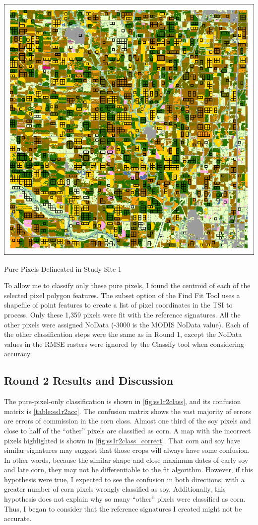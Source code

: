 \begin{ssfigure}
  \centering
  \includegraphics[width=.9\textwidth]{Graphics/Testing/clip1_30mCDL_pure_pixels.pdf}
  \caption{Pure Pixels Delineated in Study Site 1}
  \label{fig:ss1purepx}
\end{ssfigure}

To allow me to classify only these pure pixels, I found the centroid of each of the selected pixel polygon features. The subset option of the Find Fit Tool uses a shapefile of point features to create a list of pixel coordinates in the TSI to process. Only these 1,359 pixels were fit with the reference signatures. All the other pixels were assigned NoData (-3000 is the MODIS NoData value). Each of the other classification steps were the same as in Round 1, except the NoData values in the RMSE rasters were ignored by the Classify tool when considering accuracy.


\subsection*{Round 2 Results and Discussion}

The pure-pixel-only classification is shown in \cref{fig:ss1r2class}, and its confusion matrix is \autoref{table:ss1r2acc}. The confusion matrix shows the vast majority of errors are errors of commission in the corn class. Almost one third of the soy pixels and close to half of the ``other'' pixels are classified as corn. A map with the incorrect pixels highlighted is shown in \cref{fig:ss1r2class_correct}. That corn and soy have similar signatures may suggest that those crops will always have some confusion. In other words, because the similar shape and close maximum dates of early soy and late corn, they may not be differentiable to the fit algorithm. However, if this hypothesis were true, I expected to see the confusion in both directions, with a greater number of corn pixels wrongly classified as soy. Additionally, this hypothesis does not explain why so many ``other'' pixels were classified as corn. Thus, I began to consider that the reference signatures I created might not be accurate.

